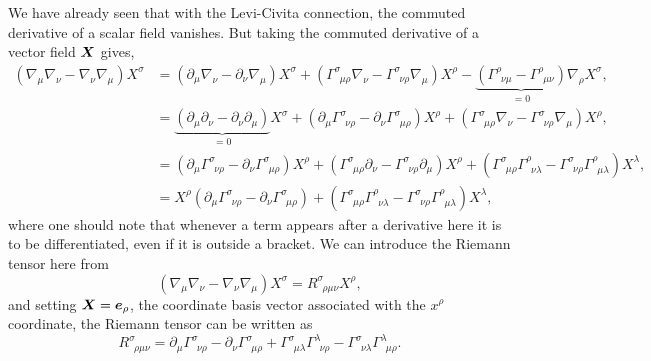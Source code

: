 We have already seen that with the Levi-Civita connection, the commuted derivative of a scalar field vanishes. But taking the commuted derivative of a vector field $\boldsymbol{X}$ gives,
\begin{align}
(\nabla_\mu \nabla_\nu  - \nabla_\nu \nabla_\mu )X^\sigma &=(\partial_\mu \nabla_\nu  - \partial_\nu \nabla_\mu )X^\sigma + (\Gamma^{\sigma}_{\,\,\,\mu\rho}\nabla_\nu -\Gamma^{\sigma}_{\,\,\,\nu\rho}\nabla_\mu  )X^\rho - \underbrace{(\Gamma^{\rho}_{\,\,\,\nu\mu} - \Gamma^{\rho}_{\,\,\,\mu\nu})}_{=0}\nabla_\rho X^\sigma , \\
                         &=\underbrace{(\partial_\mu \partial_\nu  - \partial_\nu \partial_\mu )}_{=0}X^\sigma + (\partial_\mu \Gamma^\sigma_{\,\,\,\nu\rho}  - \partial_\nu \Gamma^\sigma_{\,\,\,\mu\rho} )X^\rho + (\Gamma^{\sigma}_{\,\,\,\mu\rho}\nabla_\nu -\Gamma^{\sigma}_{\,\,\,\nu\rho}\nabla_\mu  )X^\rho  , \\
                         &=(\partial_\mu \Gamma^\sigma_{\,\,\,\nu\rho}  - \partial_\nu \Gamma^\sigma_{\,\,\,\mu\rho} )X^\rho + (\Gamma^{\sigma}_{\,\,\,\mu\rho}\partial_\nu -\Gamma^{\sigma}_{\,\,\,\nu\rho}\partial_\mu  )X^\rho 
                         + (\Gamma^{\sigma}_{\,\,\,\mu\rho}\Gamma^\rho_{\,\,\,\nu\lambda} -\Gamma^{\sigma}_{\,\,\,\nu\rho}\Gamma^\rho_{\,\,\,\mu\lambda} )X^\lambda,\\
                         &=X^\rho(\partial_\mu \Gamma^\sigma_{\,\,\,\nu\rho}  - \partial_\nu \Gamma^\sigma_{\,\,\,\mu\rho} ) + (\Gamma^{\sigma}_{\,\,\,\mu\rho}\Gamma^\rho_{\,\,\,\nu\lambda} -\Gamma^{\sigma}_{\,\,\,\nu\rho}\Gamma^\rho_{\,\,\,\mu\lambda} )X^\lambda,
\end{align}
where one should note that whenever a term appears after a derivative here it is to be differentiated, even if it is outside a bracket. We can introduce the Riemann tensor here from
\begin{equation}
(\nabla_\mu \nabla_\nu  - \nabla_\nu \nabla_\mu )X^\sigma = R^\sigma_{\,\,\,\rho\mu\nu} X^\rho,
\end{equation}
and setting $\boldsymbol{X} = \boldsymbol{e}_{\rho}$, the coordinate basis vector associated with the $x^\rho$ coordinate, the Riemann tensor can be written as
\begin{equation}
R^\sigma_{\,\,\,\rho\mu\nu} = \partial_\mu \Gamma^\sigma_{\,\,\,\nu\rho}  - \partial_\nu \Gamma^\sigma_{\,\,\,\mu\rho}  + \Gamma^{\sigma}_{\,\,\,\mu\lambda}\Gamma^\lambda_{\,\,\,\nu\rho} -\Gamma^{\sigma}_{\,\,\,\nu\lambda}\Gamma^\lambda_{\,\,\,\mu\rho}. 
\end{equation}

